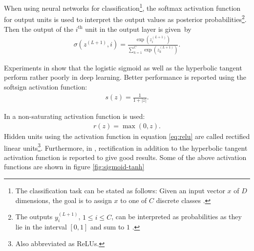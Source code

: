 When using neural networks for classification\footnote{The classification task can be stated as follows: Given an input vector $x$ of $D$ dimensions, the goal is to assign $x$ to one of $C$ discrete classes \cite{Bishop:2006}.}, the softmax activation function for output units is used to interpret the output values as posterior probabilities\footnote{The outputs $y_i^{(L+1)}$, $1 \leq i \leq C$, can be interpreted as probabilities as they lie in the interval $[0,1]$ and sum to $1$ \cite{Bishop:2006}.}. Then the output of the $i^{\text{th}}$ unit in the output layer is given~by
\begin{align}
	\sigma(z^{(L+1)},i) = \frac{\exp(z_i^{(L+1)})}{\sum_{k = 1} ^C \exp(z_k^{(L+1)})}.
\end{align}


Experiments in \cite{GlorotBengio:2010} show that the logistic sigmoid as well as the hyperbolic tangent perform rather poorly in deep learning. Better performance is reported using the softsign activation function:
\begin{align}
	\label{eq:softsign}
	s(z) = \frac{1}{1+ |z|}.
\end{align}

In \cite{KrizhevskySutskeverHinton:2012} a non-saturating activation function is used:
\begin{align}
	\label{eq:relu}
	r(z) = \max (0,z).
\end{align}
Hidden units using the activation function in equation \eqref{eq:relu} are called rectified linear units\footnote{Also abbreviated as ReLUs.}. Furthermore, in \cite{JarrettKavukcuogluRanzatoLeCun:2009}, rectification in addition to the hyperbolic tangent activation function is reported to give good results. Some of the above activation functions are shown in figure \ref{fig:sigmoid-tanh}

